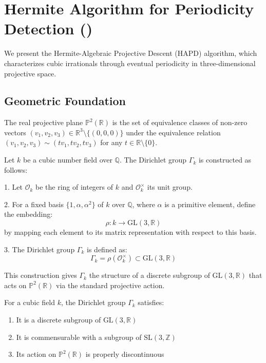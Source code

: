 \section{Hermite Algorithm for Periodicity Detection (\HAPD)}\label{sec:hapd_algorithm}

We present the Hermite-Algebraic Projective Descent (HAPD) algorithm, which characterizes cubic irrationals through eventual periodicity in three-dimensional projective space.

\subsection{Geometric Foundation}

\begin{definition}
The real projective plane $\mathbb{P}^2(\mathbb{R})$ is the set of equivalence classes of non-zero vectors $(v_1, v_2, v_3) \in \mathbb{R}^3 \setminus \{(0,0,0)\}$ under the equivalence relation $(v_1, v_2, v_3) \sim (tv_1, tv_2, tv_3)$ for any $t \in \mathbb{R} \setminus \{0\}$.
\end{definition}

\begin{definition}\label{def:dirichlet_group}
Let $k$ be a cubic number field over $\mathbb{Q}$. The Dirichlet group $\Gamma_k$ is constructed as follows:

1. Let $\mathcal{O}_k$ be the ring of integers of $k$ and $\mathcal{O}_k^\times$ its unit group.

2. For a fixed basis $\{1, \alpha, \alpha^2\}$ of $k$ over $\mathbb{Q}$, where $\alpha$ is a primitive element, define the embedding:
\begin{equation}
\rho: k \to \text{GL}(3, \mathbb{R})
\end{equation}
by mapping each element to its matrix representation with respect to this basis.

3. The Dirichlet group $\Gamma_k$ is defined as:
\begin{equation}
\Gamma_k = \rho(\mathcal{O}_k^\times) \subset \text{GL}(3, \mathbb{R})
\end{equation}

This construction gives $\Gamma_k$ the structure of a discrete subgroup of $\text{GL}(3, \mathbb{R})$ that acts on $\mathbb{P}^2(\mathbb{R})$ via the standard projective action.
\end{definition}

\begin{lemma}\label{lem:gamma_properties}
For a cubic field $k$, the Dirichlet group $\Gamma_k$ satisfies:
\begin{enumerate}
    \item It is a discrete subgroup of $\text{GL}(3, \mathbb{R})$
    \item It is commensurable with a subgroup of $\text{SL}(3, \mathbb{Z})$
    \item Its action on $\mathbb{P}^2(\mathbb{R})$ is properly discontinuous
\end{enumerate}
\end{lemma}

